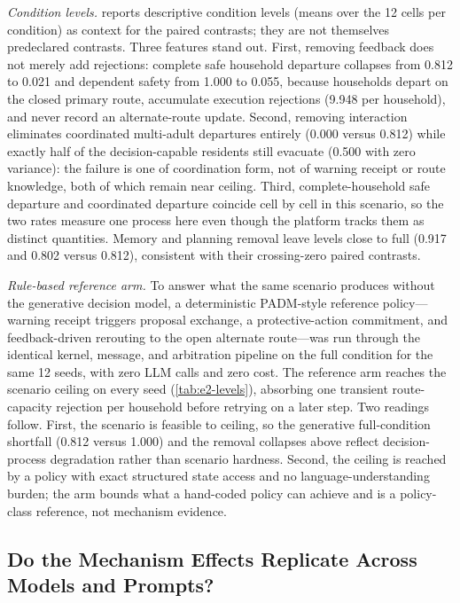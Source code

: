\documentclass[journal]{IEEEtran}
\begin{document}
\emph{Condition levels.}  reports descriptive condition
levels (means over the 12 cells per condition) as context for the paired
contrasts; they are not themselves predeclared contrasts. Three features stand
out. First, removing feedback does not merely add rejections: complete safe
household departure collapses from 0.812 to 0.021 and dependent safety from
1.000 to 0.055, because households depart on the closed primary route,
accumulate execution rejections (9.948 per household), and never record an
alternate-route update. Second, removing interaction eliminates coordinated
multi-adult departures entirely (0.000 versus 0.812) while exactly half of the
decision-capable residents still evacuate (0.500 with zero variance): the
failure is one of coordination form, not of warning receipt or route knowledge,
both of which remain near ceiling. Third, complete-household safe departure
and coordinated departure coincide cell by cell in this
scenario, so the two
rates measure one process here even though the platform tracks them as distinct
quantities. Memory and planning removal leave levels close to full (0.917 and
0.802 versus 0.812), consistent with their crossing-zero paired contrasts.

\emph{Rule-based reference arm.} To answer what the same scenario produces
without the generative decision model, a deterministic PADM-style reference
policy---warning receipt triggers proposal exchange, a
protective-action commitment, and feedback-driven rerouting to the open
alternate route---was run through the identical kernel, message, and
arbitration pipeline on the full condition for the same 12 seeds, with zero
LLM calls and zero cost. The reference arm reaches the scenario ceiling on
every seed (\cref{tab:e2-levels}), absorbing one transient
route-capacity rejection per household before retrying on a later step. Two
readings follow. First, the scenario is feasible to ceiling, so the generative
full-condition shortfall (0.812 versus 1.000) and the removal collapses above
reflect decision-process degradation rather than scenario hardness. Second,
the ceiling is reached by a policy with exact structured state access and no
language-understanding burden; the arm bounds what a hand-coded policy can
achieve and is a policy-class reference, not mechanism evidence.

\subsection{Do the Mechanism Effects Replicate Across Models and Prompts?}
\label{sec:exp-e3}
\end{document}
